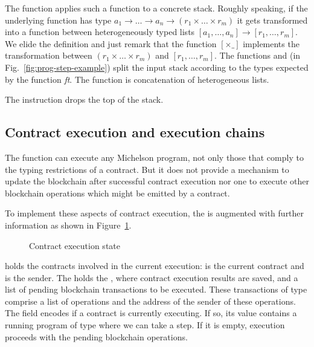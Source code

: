 The function  applies such a function to a concrete
stack. Roughly speaking, if the underlying function has type $a_1 \to \dots \to a_n \to
(r_1 \times \dots \times r_m)$ it gets transformed into a function
between heterogeneously typed lists
$[a_1, \dots, a_n] \to [r_1, \dots, r_m]$. We elide the definition and
just remark that the function $[{\times}\_]$ implements the
transformation between $(r_1 \times \dots \times r_m)$ and $[r_1,
\dots, r_m]$. The functions  and  (in Fig.~\ref{fig:prog-step-example}) split the
input stack according to the types expected by the function \textit{ft}. The
function  is concatenation of heterogeneous lists.

The  instruction drops the top of the stack.



\subsection{Contract execution and execution chains}\label{sec:contract-execution}

The  function can execute any Michelson program, not only those that comply
to the typing restrictions of a contract.
But it does not provide a mechanism to update the blockchain after successful contract execution
nor one to execute other blockchain operations which might be emitted by a contract.

\begin{comment}
When a contract execution terminates, the final stack interpretation will contain a pair
of a list of blockchain operations to be emitted by the contract as well as the updated
storage value of the contract.
Also contract execution is triggered by transfering some amount of Tezos tokens to it,
so it's balance and storage has to be updated and the emitted operations
must be staged for execution.
\end{comment}


To implement these aspects of contract execution, the 
is augmented with further information as shown in Figure~\ref{fig:contract-execution-state}.
\begin{figure}[tp]
  \ConcretePrgRunning
  \ConcreteTransaction
  \ConcreteExecState
  \caption{Contract execution state}
  \label{fig:contract-execution-state}
\end{figure}
 holds the contracts involved in the current
execution:  is the current contract and  is
the sender.
The  holds the , where contract execution results are saved,
and a list of pending blockchain transactions to be executed. These
transactions of type  comprise a list of operations and the address of the
sender of these operations.
The field  encodes if a contract is currently executing.
If so, its value contains a running program of type 
where we can take a step. If it is empty, execution
proceeds with the pending blockchain operations.


